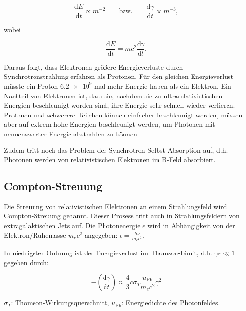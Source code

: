 \begin{equation}
 \frac{\mathrm{d}E}{\mathrm{d}t}\propto m^{-2} \qquad \text{bzw.} \qquad \frac{\mathrm{d}\gamma}{\mathrm{d}t}\propto m^{-3},
\end{equation}

wobei 

\begin{equation}
 \frac{\mathrm{d}E}{\mathrm{d}t} = mc^2 \frac{\mathrm{d}\gamma}{\mathrm{d}t}.
\end{equation}

Daraus folgt, dass Elektronen größere Energieverluste durch Synchrotronstrahlung erfahren als Protonen.
Für den gleichen Energieverlust müsste ein Proton $\num{6,2e9}$ mal mehr Energie haben als ein Elektron.
Ein Nachteil von Elektronen ist, dass sie, nachdem sie zu ultrarelativistischen Energien beschleunigt worden sind, ihre Energie sehr schnell wieder verlieren.
Protonen und schwerere Teilchen können einfacher beschleunigt werden,  müssen aber auf extrem hohe Energien beschleunigt werden, um Photonen mit nennenswerter Energie abstrahlen zu können.

Zudem tritt noch das Problem der Synchrotron-Selbst-Absorption auf, d.h. Photonen werden von relativistischen Elektronen im B-Feld absorbiert.\cite{RelativisticJets}

\subsection{Compton-Streuung}
Die Streuung von relativistischen Elektronen an einem Strahlungsfeld wird Compton-Streuung genannt.
Dieser Prozess tritt auch in Strahlungsfeldern von extragalaktischen Jets auf.
Die Photonenergie $\epsilon$ wird in Abhängigkeit von der Elektron\-/Ruhemasse $m_e c^2$ angegeben: $\epsilon= \frac{h\nu}{m_e c^2}$. \cite{RelativisticJets}
 
In niedrigster Ordnung ist der Energieverlust im Thomson-Limit, d.h. $\gamma \epsilon \ll 1$ gegeben durch:

\begin{equation}
-\left(\frac{\mathrm{d}\gamma}{\mathrm{d}t} \right) \approx \frac{4}{3} c \sigma_T \frac{u_{\text{Ph}}}{m_e c^2} \gamma^2
\end{equation}

\begin{center}
 \begin{small}
  $\sigma_T$: Thomson-Wirkungsquerschnitt, $u_{\text{Ph}}$: Energiedichte des Photonfeldes.
 \end{small}
\end{center}

